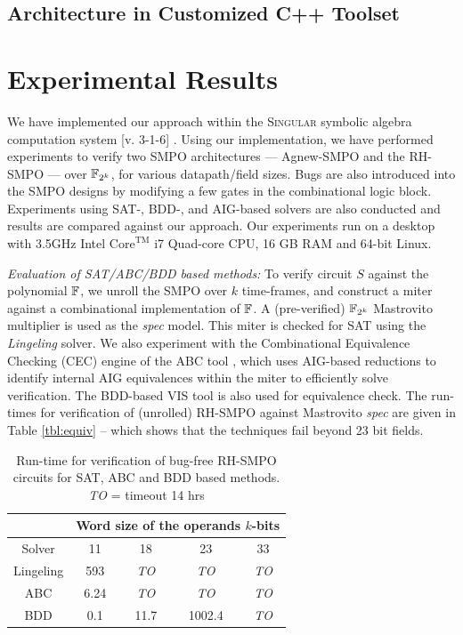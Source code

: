\subsection{Architecture in Customized C++ Toolset}

\section{Experimental Results}
\label{sec:result}

We have implemented our approach within the \textsc{Singular} symbolic
algebra computation system [v. 3-1-6] \cite{DGPS}. Using our
implementation, we have performed experiments to verify two SMPO
architectures --- Agnew-SMPO \cite{agnew1991implementation} and the
RH-SMPO \cite{RHmulti} --- over ${\mathbb{F}}_{2^k}$, for various datapath/field
sizes. Bugs are also introduced into the SMPO designs by modifying a
few gates in the combinational logic block. Experiments using SAT-,
BDD-, and AIG-based solvers are also conducted and results are
compared against our approach.  Our experiments run on a desktop with
3.5GHz Intel $\text{Core}^\text{TM}$ i7 Quad-core CPU, 16 GB RAM and
64-bit Linux.   

{\it Evaluation of SAT/ABC/BDD based methods:} To verify circuit $S$
against the polynomial ${\mathbb{F}}$, we unroll the SMPO over $k$ time-frames,
and construct a miter against a combinational implementation of ${\mathbb{F}}$.
A (pre-verified) ${\mathbb{F}}_{2^k}$ Mastrovito multiplier \cite{mastro:1989} is
used as the {\it spec} model. This miter is checked for SAT using the
\emph{Lingeling} \cite{biere2013lingeling} solver. We also experiment
with the Combinational Equivalence Checking (CEC) engine of the ABC
tool \cite{abc}, which uses AIG-based reductions to identify internal
AIG equivalences within the miter to efficiently solve
verification. The BDD-based VIS tool \cite{brayton1996vis} is also used
for equivalence check. The run-times for verification of (unrolled)
RH-SMPO against Mastrovito {\it   spec} are given in Table
\ref{tbl:equiv} -- which shows that the techniques fail beyond 23 bit
fields.  

\vspace{-0.1in}
\begin{table}[htb]
\centering
\caption{\small Run-time for verification of bug-free RH-SMPO circuits
  for SAT, ABC and BDD based methods. \emph{TO} = timeout 14 hrs}
\label{tbl:equiv}
\begin{tabular}{|c||c|c|c|c|} 
\hline
& \multicolumn{4}{|c|}{Word size of the operands $k$-bits}  \\
\hline
Solver & 11 & 18 & 23 & 33 \\
\hline
\hline
Lingeling & 593  & \emph{TO}  & \emph{TO}  & \emph{TO}\\
\hline
\hline
ABC & 6.24 & \emph{TO} & \emph{TO} & \emph{TO}\\
\hline
\hline
BDD & 0.1 & 11.7 & 1002.4 & \emph{TO}  \\
\hline
\end{tabular}
\label{table:satbdd}  
\end{table} 

